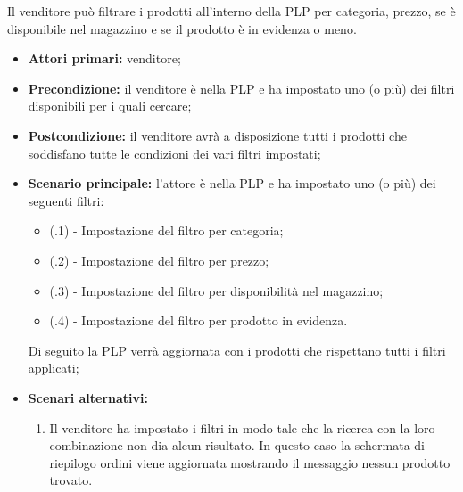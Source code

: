 Il venditore può filtrare i prodotti all'interno della PLP per categoria, prezzo, se è disponibile nel magazzino e se il prodotto è in evidenza o meno.
\begin{itemize}
	\item \textbf{Attori primari:} venditore;
	\item \textbf{Precondizione:} il venditore è nella PLP e ha impostato uno (o più) dei filtri disponibili per i quali cercare;
	\item \textbf{Postcondizione:} il venditore avrà a disposizione tutti i prodotti che soddisfano tutte le condizioni dei vari filtri impostati;
	\item \textbf{Scenario principale:} l'attore è nella PLP e ha impostato uno (o più) dei seguenti filtri:
	\begin{itemize}
		\item (\actualUC.1) - Impostazione del filtro per categoria;
		\item (\actualUC.2) - Impostazione del filtro per prezzo;
		\item (\actualUC.3) - Impostazione del filtro per disponibilità nel magazzino;
		\item (\actualUC.4) - Impostazione del filtro per prodotto in evidenza.
	\end{itemize}
	Di seguito la PLP verrà aggiornata con i prodotti che rispettano tutti i filtri applicati;
	\item \textbf{Scenari alternativi:}
	\begin{enumerate}[label=\lett]
		\item Il venditore ha impostato i filtri in modo tale che la ricerca con la loro combinazione non dia alcun risultato. In questo caso la schermata di riepilogo ordini viene aggiornata mostrando il messaggio nessun prodotto trovato.
	\end{enumerate}
\end{itemize}

